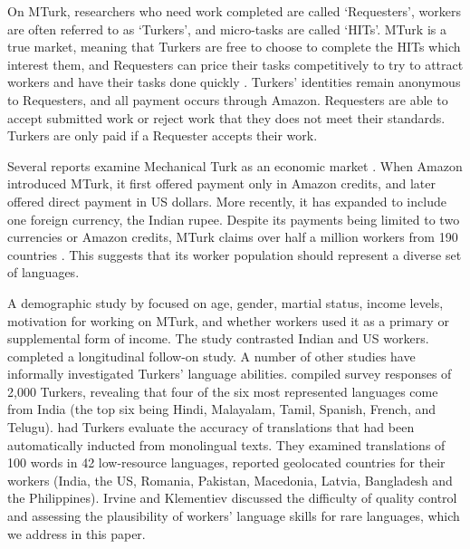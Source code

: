 \documentclass[11pt]{article}
\begin{document}
\nocite{novotney-callisonburch:2010:NAACLHLT}

On MTurk, researchers who need work completed are called `Requesters', workers are often referred to as `Turkers', and micro-tasks are called `HITs'.  MTurk is a true market, meaning that Turkers are free to choose to complete the HITs which interest them, and Requesters can price their tasks competitively to try to attract workers and have their tasks done quickly \cite{faridani-et-al:2011,singer-mittal:2011}. Turkers' identities remain anonymous to Requesters, and all payment occurs through Amazon. Requesters are able to accept submitted work or reject work that they does not meet their standards.  Turkers are only paid if a Requester accepts their work. 

Several reports examine Mechanical Turk as an economic market \cite{ipeirotis:2010:marketplace,lehdonvirta-ernkvist:2011}.  When Amazon introduced MTurk, it first offered payment only in Amazon credits, and later offered direct payment in US dollars. More recently, it has expanded to include one foreign currency, the Indian rupee. Despite its payments being limited to two currencies or Amazon credits, MTurk claims over half a million workers from 190 countries \cite{AmazonRequesterTour}.  This suggests that its worker population should represent a diverse set of languages.

A demographic study by  focused on age, gender, martial status, income levels, motivation for working on MTurk, and whether workers used it as a primary or supplemental form of income.  The study contrasted Indian and US workers.  completed a longitudinal follow-on study. 
A number of other studies have informally investigated Turkers' language abilities.   compiled survey responses of 2,000 Turkers, revealing that four of the six most represented languages come from India (the top six being Hindi, Malayalam, Tamil, Spanish, French, and Telugu).   had Turkers evaluate the accuracy of translations that had been automatically inducted from monolingual texts.  They examined translations of 100 words in 42 low-resource languages, reported geolocated countries for their workers (India, the US, Romania, Pakistan, Macedonia, Latvia, Bangladesh and the Philippines).  Irvine and Klementiev discussed the difficulty of quality control and assessing the plausibility of workers' language skills for rare languages, which we address in this paper. 
\end{document}

